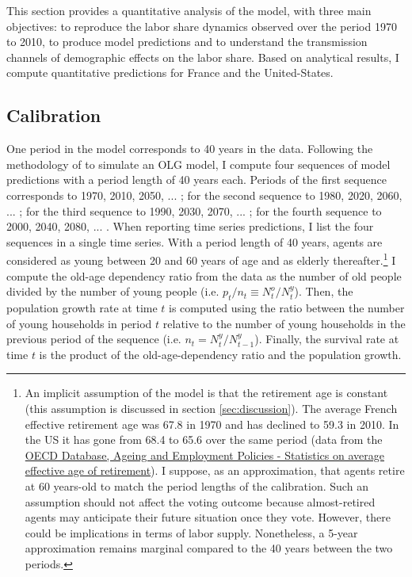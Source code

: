 This section provides a quantitative analysis of the model, with three main objectives: to reproduce the labor share dynamics observed over the period 1970 to 2010, to produce model predictions and to understand the transmission channels of demographic effects on the labor share. Based on analytical results, I compute quantitative predictions for France and the United-States.

\subsection{Calibration}\label{subsec:calibration}
One period in the model corresponds to 40 years in the data. Following the methodology of \cite{Gonzalez-Eiras2012} to simulate an OLG model, I compute four sequences of model predictions with a period length of 40 years each. Periods of the first sequence corresponds to 1970, 2010, 2050, ... ; for the second sequence to 1980, 2020, 2060, ... ; for the third sequence to 1990, 2030, 2070, ... ; for the fourth sequence to 2000, 2040, 2080, ... . When reporting time series predictions, I list the four sequences in a single time series.
With a period length of 40 years, agents are considered as young between 20 and 60 years of age and as elderly thereafter.\footnote{An implicit assumption of the model is that the retirement age is constant (this assumption is discussed in section \ref{sec:discussion}). The average French effective retirement age was 67.8 in 1970 and has declined to 59.3 in 2010. In the US it has gone from 68.4 to 65.6 over the same period (data from the \href{https://www.oecd.org/els/emp/average-effective-age-of-retirement.htm}{OECD Database, Ageing and Employment Policies - Statistics on average effective age of retirement}). I suppose, as an approximation, that agents retire at 60 years-old to match the period lengths of the calibration. Such an assumption should not affect the voting outcome because almost-retired agents may anticipate their future situation once they vote. However, there could be implications in terms of labor supply. Nonetheless, a 5-year approximation remains marginal compared to the 40 years between the two periods. %
} I compute the old-age dependency ratio from the data as the number of old people divided by the number of young people (i.e. $p_t/n_t \equiv N_t^o/N_t^y$). Then, the population growth rate at time $t$ is computed using the ratio between the number of young households in period $t$ relative to the number of young households in the previous period of the sequence (i.e. $n_t = N_t^y/N_{t-1}^y$). Finally, the survival rate at time $t$ is the product of the old-age-dependency ratio and the population growth.%

